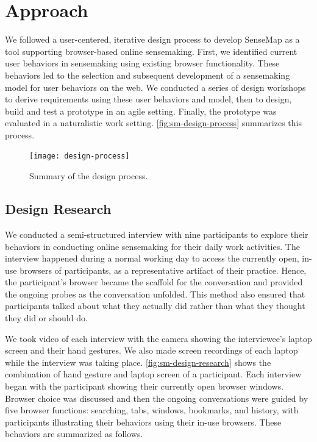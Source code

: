 \section{Approach}
We followed a user-centered, iterative design process to develop SenseMap as a tool supporting browser-based online sensemaking. First, we identified current user behaviors in sensemaking using existing browser functionality. These behaviors led to the selection and subsequent development of a sensemaking model for user behaviors on the web. We conducted a series of design workshops to derive requirements using these user behaviors and model, then to design, build and test a prototype in an agile setting. Finally, the prototype was evaluated in a naturalistic work setting. \autoref{fig:sm-design-process} summarizes this process.

\begin{figure}[!htb]
	\centering
	\texttt{[image: design-process]}
	\caption{Summary of the design process.}
	\label{fig:sm-design-process}
\end{figure}

\subsection{Design Research}
We conducted a semi-structured interview with nine participants to explore their behaviors in  conducting online sensemaking for their daily work activities. The interview happened during a normal working day to access the currently open, in-use browsers of participants, as a representative artifact of their practice. Hence, the participant's browser became the scaffold for the conversation and provided the ongoing probes as the conversation unfolded. This method also ensured that participants talked about what they actually did rather than what they thought they did or should do.

We took video of each interview with the camera showing the interviewee's laptop screen and their hand gestures. We also made screen recordings of each laptop while the interview was taking place. \autoref{fig:sm-design-research} shows the combination of hand gesture and laptop screen of a participant. Each interview began with the participant showing their currently open browser windows. Browser choice was discussed and then the ongoing conversations were guided by five browser functions: searching, tabs, windows, bookmarks, and history, with participants illustrating their behaviors using their in-use browsers. These behaviors are summarized as follows.

